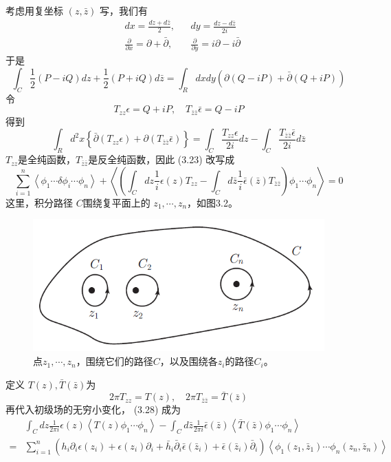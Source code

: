 考虑用复坐标 $(z,\bar{z})$ 写，我们有
\begin{equation}
\begin{aligned} &d x=\frac{d z+d \bar{z}}{2},&&d y=\frac{d z-d \bar{z}}{2 i}\\ &\frac{\partial}{\partial x}=\partial+\bar{\partial}, && \frac{\partial}{\partial y}=i \partial-i \bar{\partial} 
\end{aligned}
\end{equation}
于是
\begin{equation}
	\int_{C} \frac{1}{2}(P-i Q) d z+\frac{1}{2}(P+i Q) d \bar{z}=\int_{R} d x d y(\partial(Q-i P)+\bar{\partial}(Q+i P))
\end{equation}
令
\[
T_{z z} \epsilon=Q+i P, \quad T_{\bar{z} \bar{z}} \bar{\epsilon}=Q-i P\]
得到
\begin{equation}
	\int_{R} d^{2} x\left\{\bar{\partial}\left(T_{z z} \epsilon\right)+\partial\left(T_{\bar{z} \bar{z}} \bar{\epsilon}\right)\right\}=\int_{C} \frac{T_{z z} \epsilon}{2 i} d z-\int_{C} \frac{T_{\bar{z} \bar{z}} \bar{\epsilon}}{2 i} d \bar{z}
\end{equation}
$T_{zz} $是全纯函数，$ T_{\bar{z} \bar{z}} $是反全纯函数，因此 (3.23) 改写成
\begin{equation}
\sum_{i=1}^{n}\left\langle\phi_{1} \cdots \delta \phi_{i} \cdots \phi_{n}\right\rangle+\left\langle\left(\int_{C} d z \frac{1}{i} \epsilon(z) T_{z z}-\int_{C} d \bar{z} \frac{1}{i} \bar{\epsilon}(\bar{z}) T_{\bar{z} \bar{z}}\right) \phi_{1} \cdots \phi_{n}\right\rangle=0 
\end{equation}
这里，积分路径 $C $围绕复平面上的 $z_1,\cdots,z_n $，如图3.2。
\begin{figure}[h]
	\centering
	\includegraphics[width=0.6\linewidth]{fig/3.2.png}
	\caption{ 点$z_1,\cdots,z_n$，围绕它们的路径$C$，以及围绕各$z_i$的路径$C_i$。}
\end{figure}
定义 $T(z),\bar{T}(\bar{z}) $为
\[
2 \pi T_{z z}=T(z), \quad 2 \pi T_{\bar{z} \bar{z}}=\bar{T}(\bar{z})
\]
再代入初级场的无穷小变化， (3.28) 成为
\begin{equation}
\begin{aligned} &\int_{C} d z \frac{1}{2 \pi i} \epsilon(z)\left\langle T(z) \phi_{1} \cdots \phi_{n}\right\rangle-\int_{C} d \bar{z} \frac{1}{2 \pi i} \bar{\epsilon}(\bar{z})\left\langle\bar{T}(\bar{z}) \phi_{1} \cdots \phi_{n}\right\rangle\\ =&\sum_{i=1}^{n}\left(h_{i} \partial_{i} \epsilon\left(z_{i}\right)+\epsilon\left(z_{i}\right) \partial_{i}+\bar{h}_{i} \bar{\partial}_{i} \bar{\epsilon}\left(\bar{z}_{i}\right)+\bar{\epsilon}\left(\bar{z}_{i}\right) \bar{\partial}_{i}\right)\left\langle\phi_{1}\left(z_{1}, \bar{z}_{1}\right) \cdots \phi_{n}\left(z_{n}, \bar{z}_{n}\right)\right\rangle \end{aligned}
\end{equation}


